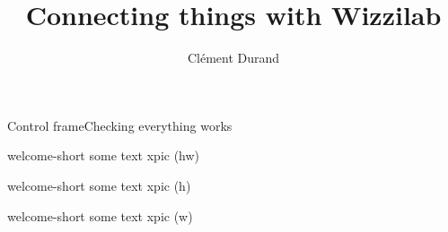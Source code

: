 \documentclass[aspectratio=169]{beamer}
\title[Stage de seconde année à l'École polytechnique]
      {Connecting things with Wizzilab}
\author{Clément Durand}
\begin{document}
\maketitle



\begin{xframe}{Control frame}{Checking everything works}
  \lipsum[1]
\end{xframe}

\begin{xpic}{welcome-short}
  some text xpic (hw)
\end{xpic}

\begin{xpic}[h]{welcome-short}
  some text xpic (h)
\end{xpic}

\begin{xpic}[w]{welcome-short}
  some text xpic (w)
\end{xpic}
\end{document}
